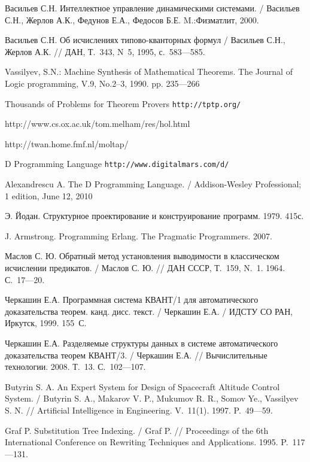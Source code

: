 \begin{thebibliography}{99}

%
%


 Васильев С.Н. Интеллектное управление динамическими системами. / Васильев С.Н., Жерлов А.К., Федунов Е.А., Федосов Б.Е.  M.:Физматлит, 2000.

 Васильев С.Н. Об исчислениях типово-кванторных формул / Васильев С.Н., Жерлов А.К.  // ДАН, Т.~343, N~5, 1995, с.~583---585.

 Vassilyev, S.N.: Machine Synthesis of Mathematical Theorems. The Journal of Logic programming, V.9, No.2--3, 1990. pp. 235---266

 Thousands of Problems for Theorem Provers {\tt http://tptp.org/}

 http://www.cs.ox.ac.uk/tom.melham/res/hol.html

 http://twan.home.fmf.nl/moltap/

 D Programming Language {\tt http://www.digitalmars.com/d/}

 Alexandrescu A. The D Programming Language. / Addison-Wesley Professional; 1 edition, June 12, 2010

 Э. Йодан. Структурное проектирование и конструирование программ. 1979. 415с.

 J. Armstrong. Programming Erlang. The Pragmatic Programmers. 2007.

 Маслов С. Ю. Обратный метод установления выводимости в классическом исчислении предикатов. / Маслов С. Ю. // ДАН СССР, Т.~159, N.~1. 1964. С.~17---20.

 Черкашин Е.А. Программная система КВАНТ/1 для автоматического доказательства теорем. канд. дисс. текст. / Черкашин Е.А. / ИДСТУ СО РАН, Иркутск, 1999. 155~С.

 Черкашин Е.А. Разделяемые структуры данных в системе автоматического доказательства теорем КВАНТ/3. / Черкашин Е.А. // Вычислительные технологии. 2008. Т.~13. С.~102---107.

 Butyrin S. A. An {E}xpert {S}ystem for {D}esign of {S}pacecraft  {A}ltitude {C}ontrol {S}ystem. / Butyrin S. A., Makarov V. P., Mukumov R. R., Somov Ye., Vassilyev S. N. // Artificial Intelligence in Engineering. V.~11(1). 1997. P.~49---59.

 Graf P. Substitution Tree Indexing. / Graf P. // Proceedings of the 6th International Conference on Rewriting Techniques and Applications. 1995. P.~117---131.


\end{thebibliography}
